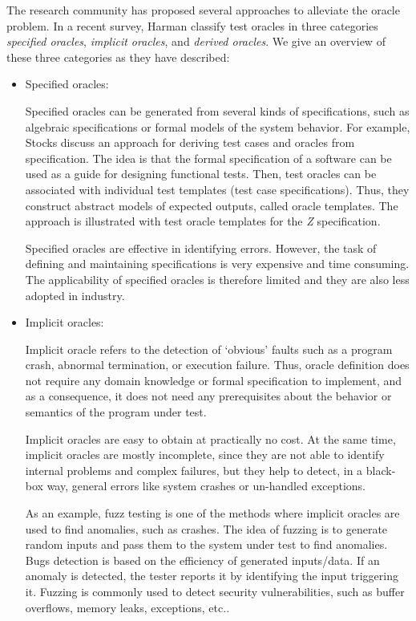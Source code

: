 The research community has proposed several approaches\cite{harman2013comprehensive,barr2015oracle} to alleviate the oracle problem. 
In a recent survey, Harman \etal\cite{harman2013comprehensive} classify test oracles in three categories \textit{specified oracles}, \textit{implicit oracles}, and \textit{derived oracles}. We give an overview of these three categories as they have described:
\begin{itemize}
	\item Specified oracles:
	
	Specified oracles can be generated from several kinds of specifications, such as algebraic specifications or formal models of the system behavior. 
	For example, Stocks \etal\cite{stocks1996framework,richardson1992specification} discuss an approach for deriving test cases and oracles from specification. The idea is that the formal specification of a software can be used as a guide for designing functional tests. Then, test oracles can be associated with individual test templates (test case specifications). Thus, they construct abstract models of expected outputs, called oracle templates. 
	The approach is illustrated with test oracle templates for the \textit{Z} specification.
	
	Specified oracles are effective in identifying errors. However, the task of defining and maintaining specifications is very expensive and time consuming. The applicability of specified oracles is therefore limited and they are also less adopted in industry.
	
	\item Implicit oracles:
	
	Implicit oracle refers to the detection of ‘obvious’ faults such as a program crash, abnormal termination, or execution failure.
	Thus, oracle definition does not require any domain knowledge or formal specification to implement, and as a consequence, it does not need any prerequisites about the behavior or semantics of the program under test.
	
	Implicit oracles\cite{harman2013comprehensive,barr2015oracle} are easy to obtain at practically no cost. At the same time, implicit oracles are mostly incomplete, since they are not able to identify internal problems and complex failures, but they help to detect, in a black-box way, general errors like system crashes or un-handled exceptions.
	
	As an example, fuzz testing\cite{miller1990empirical} is one of the methods where implicit oracles are used to find anomalies, such as crashes. The idea of fuzzing is to generate random inputs and pass them to the system under test to find anomalies.
	Bugs detection is based on the efficiency of generated inputs/data. If an anomaly is detected, the tester reports it by identifying the input triggering it. 
	Fuzzing is commonly used to detect security vulnerabilities, such as buffer overflows, memory leaks, exceptions, etc.\cite{bekrar2011finding}.
	

\end{itemize}
